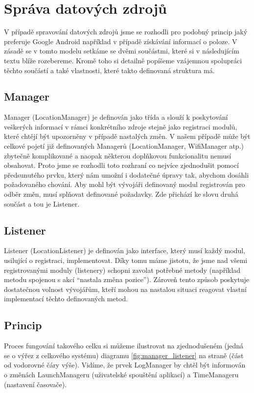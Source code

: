 \documentclass[thesis=M,czech]{FITthesis}[2012/06/26]
\begin{document}
\section{Správa datových zdrojů}\label{data_sources_management}
V případě spravování datových zdrojů jsme se rozhodli pro podobný princip jaký preferuje Google Android například v případě získávání informací o poloze\cite{android_location}. V zásadě se v tomto modelu setkáme se dvěmi součástmi, které si v následujícím textu blíže rozebereme. Kromě toho si detailně popíšeme vzájemnou spolupráci těchto součástí a také vlastnosti, které takto definovaná struktura má.

\subsection{Manager}
Manager (LocationManager\cite{android_location_manager}) je definován jako třída\cite{class} a slouží k poskytování veškerých informací v rámci konkrétního zdroje stejně jako registraci modulů, které chtějí být upozorněny v případě nastalých změn. V našem případě může být celkové pojetí již definovaných Managerů (LocationManager, WifiManager atp.) zbytečně komplikované a naopak některou doplňkovou funkcionalitu nemusí obsahovat. Proto jsme se rozhodli toto rozhraní co nejvíce zjednodušit pomocí předsunutého prvku, který nám umožní i dodatečné úpravy tak, abychom dosáhli požadovaného chování. Aby mohl být vývojáři definovaný modul registrován pro odběr změn, musí splňovat definované požadavky. Zde přichází ke slovu druhá součást a tou je Listener.

\subsection{Listener}
Listener (LocationListener\cite{android_location_listener}) je definován jako interface\cite{interface}, který musí každý modul, usilující o registraci, implementovat. Díky tomu máme jistotu, že jsme nad všemi registrovanými moduly (listenery) schopni zavolat potřebné metody (například metodu spojenou s akcí “nastala změna pozice”). Zároveň tento způsob poskytuje dostatečnou volnost vývojářům, kteří mohou na nastalou situaci reagovat vlastní implementací těchto definovaných metod.

\subsection{Princip}
Proces fungování takového celku si můžeme ilustrovat na zjednodušeném (jedná se o výřez z celkového systému) diagramu \ref{fig:manager_listener} na straně \pageref{fig:manager_listener} (část od vodorovné čáry výše). Vidíme, že prvek LogManager by chtěl být informován o změnách LaunchManageru (uživatelské spouštění aplikací) a TimeManageru (nastavení časovače).
\end{document}
